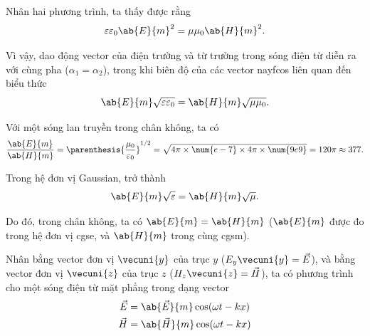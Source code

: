 \noindent
Nhân hai phương trình, ta thấy được rằng
\begin{equation}\label{eq:15_21}
    \varepsilon\varepsilon_0 \ab{E}{m}^2 = \mu\mu_0 \ab{H}{m}^2.
\end{equation}

\noindent
Vì vậy, dao động vector của điện trường và từ trường trong sóng điện từ diễn ra với cùng pha ($\alpha_1=\alpha_2$), trong khi biên độ của các vector nayfcos liên quan đến biểu thức  
\begin{equation}\label{eq:15_22}
    \ab{E}{m} \sqrt{\varepsilon\varepsilon_0} = \ab{H}{m} \sqrt{\mu\mu_0}.
\end{equation}

\noindent
Với một sóng lan truyền trong chân không, ta có
\begin{equation}\label{eq:15_23}
    \frac{\ab{E}{m}}{\ab{H}{m}} = \parenthesis{\frac{\mu_0}{\varepsilon_0}}^{1/2} = \sqrt{4\pi \times \num{e-7} \times 4\pi \times \num{9e9}} = 120\pi \approx 377.
\end{equation}

\noindent
Trong hệ đơn vị Gaussian,  trở thành
\begin{equation}\label{eq:15_24}
    \ab{E}{m} \sqrt{\varepsilon} = \ab{H}{m} \sqrt{\mu}.
\end{equation}

Do đó, trong chân không, ta có $\ab{E}{m}=\ab{H}{m}$ ($\ab{E}{m}$ được đo trong hệ đơn vị cgse, và $\ab{H}{m}$ trong cùng cgsm).

Nhân  bằng vector đơn vị $\vecuni{y}$ của trục $y$ ($E_y\vecuni{y}=\vec{E}$), và  bằng vector đơn vị $\vecuni{z}$ của trục $z$ ($H_z\vecuni{z}=\vec{H}$), ta có phương trình cho một sóng điện từ mặt phẳng trong dạng vector
\begin{equation}\label{eq:15_25}
    \begin{split}
        \vec{E} &= \ab{\vec{E}}{m} \cos(\omega t - kx)\\
        \vec{H} &= \ab{\vec{H}}{m} \cos(\omega t - kx)
    \end{split}
\end{equation}

